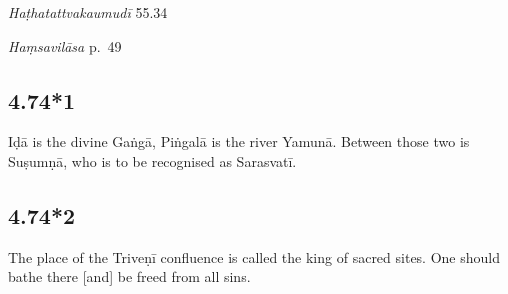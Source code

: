 \begin{ekdosis}
\begin{testimonia}[hp04_074]
\emph{Haṭhatattvakaumudī} 55.34
\begin{versinnote}
\end{versinnote}

\emph{Haṃsavilāsa} p.~49
\begin{versinnote}
\end{versinnote}
\end{testimonia}


\subsection*{4.74*1}
\begin{translation}[hp04_074_1]
Iḍā is the divine Gaṅgā, Piṅgalā is the river Yamunā. Between those two is Suṣumṇā, who is to be recognised as Sarasvatī.
\end{translation}




\subsection*{4.74*2}
\begin{translation}[hp04_074_2]
The place of the Triveṇī confluence is called the king of sacred sites. One should bathe there [and] be freed from all sins.
\end{translation}



\end{ekdosis}
